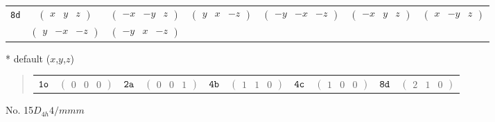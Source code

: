 \documentclass[fleqn,9pt,landscape]{jsarticle}
\begin{document}
\begin{center}
\begin{longtable}{ccccccc}
{\tt 8d} & $ \begin{pmatrix} x & y & z \end{pmatrix} $ & $ \begin{pmatrix} - x & - y & z \end{pmatrix} $ & $ \begin{pmatrix} y & x & - z \end{pmatrix} $ & $ \begin{pmatrix} - y & - x & - z \end{pmatrix} $ & $ \begin{pmatrix} - x & y & z \end{pmatrix} $ & $ \begin{pmatrix} x & - y & z \end{pmatrix} $ \\
& $ \begin{pmatrix} y & - x & - z \end{pmatrix} $ & $ \begin{pmatrix} - y & x & - z \end{pmatrix} $ & $  $ & $  $ & $  $ & $  $ \\
\end{longtable}
\end{center}
* default ($x$,$y$,$z$)
\begin{quote}
\begin{tabular}{cccccccccc}
$ {\tt 1o} $ & $ \begin{pmatrix} 0 & 0 & 0 \end{pmatrix} $ & $ {\tt 2a} $ & $ \begin{pmatrix} 0 & 0 & 1 \end{pmatrix} $ & $ {\tt 4b} $ & $ \begin{pmatrix} 1 & 1 & 0 \end{pmatrix} $ & $ {\tt 4c} $ & $ \begin{pmatrix} 1 & 0 & 0 \end{pmatrix} $ & $ {\tt 8d} $ & $ \begin{pmatrix} 2 & 1 & 0 \end{pmatrix} $
\end{tabular}
\end{quote}
\newpage
No. 15\quad$D_{4h}$\quad$4/mmm$\quad[ tetragonal ]
\end{document}
